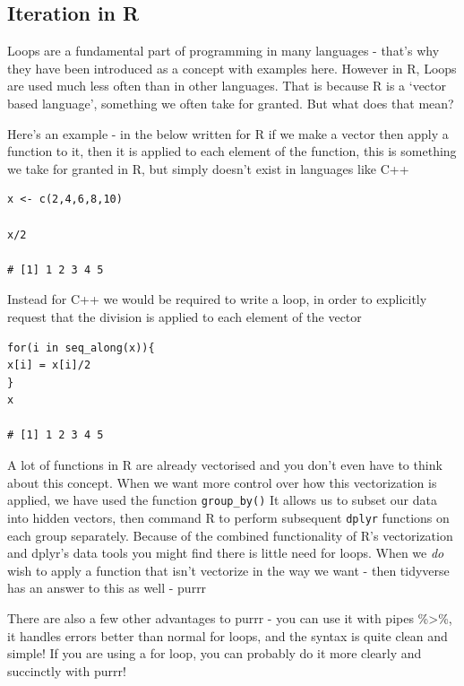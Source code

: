 \documentclass[
]{book}
\begin{document}
\hypertarget{iteration-in-r}{%
\subsection{Iteration in R}\label{iteration-in-r}}

Loops are a fundamental part of programming in many languages - that's why they have been introduced as a concept with examples here. However in R, Loops are used much less often than in other languages. That is because R is a `vector based language', something we often take for granted. But what does that mean?

Here's an example - in the below written for R if we make a vector then apply a function to it, then it is applied to each element of the function, this is something we take for granted in R, but simply doesn't exist in languages like C++

\begin{verbatim}
x <- c(2,4,6,8,10)

x/2

# [1] 1 2 3 4 5
\end{verbatim}

Instead for C++ we would be required to write a loop, in order to explicitly request that the division is applied to each element of the vector

\begin{verbatim}
for(i in seq_along(x)){
x[i] = x[i]/2
}
x

# [1] 1 2 3 4 5
\end{verbatim}

A lot of functions in R are already vectorised and you don't even have to think about this concept. When we want more control over how this vectorization is applied, we have used the function \texttt{group\_by()} It allows us to subset our data into hidden vectors, then command R to perform subsequent \texttt{dplyr} functions on each group separately. Because of the combined functionality of R's vectorization and dplyr's data tools you might find there is little need for loops. When we \emph{do} wish to apply a function that isn't vectorize in the way we want - then tidyverse has an answer to this as well - purrr \citet{R-purrr}

There are also a few other advantages to purrr - you can use it with pipes \%\textgreater\%, it handles errors better than normal for loops, and the syntax is quite clean and simple! If you are using a for loop, you can probably do it more clearly and succinctly with purrr!
\end{document}
